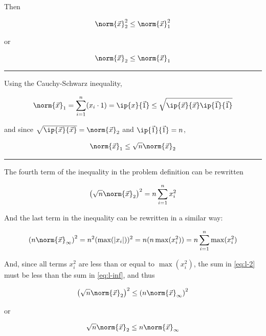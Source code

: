 \documentclass{template}
\begin{document}
Then

\begin{equation}
    \norm{\vec{x}}_2^2 \leq \norm{\vec{x}}_1^2
\end{equation}

or

\begin{equation}\label{eq:second_norm_inequality}
    \norm{\vec{x}}_2 \leq \norm{\vec{x}}_1
\end{equation}

\hrule

Using the Cauchy-Schwarz inequality, 

\begin{equation}
    \norm{\vec{x}}_1 = \sum_{i=1}^n (x_i\cdot 1) = \ip{x}{\vec{1}} \leq \sqrt{\ip{\vec{x}}{\vec{x}} \ip{\vec{1}}{\vec{1}}}
\end{equation}

and since $\sqrt{\ip{\vec{x}}{\vec{x}}} = \norm{\vec{x}}_2$ and $\ip{\vec{1}}{\vec{1}} = n$,

\begin{equation}\label{eq:third_norm_inequality}
    \norm{\vec{x}}_1 \leq \sqrt{n}\norm{\vec{x}}_2
\end{equation}

\hrule

The fourth term of the inequality in the problem definition can be rewritten

\begin{equation}\label{eq:l-2}
    \left( \sqrt{n} \norm{\vec{x}}_2    \right)^2 = n\sum_{i=1}^n x_i^2
\end{equation}

And the last term in the inequality can be rewritten in a similar way:

\begin{equation}\label{eq:l-inf}
    \left( n \norm{\vec{x}}_\infty\right)^2 = n^2(\max(|x_i|))^2     = n(n\max(x_i^2)) = n\sum_{i=1}^n \max(x_i^2)
\end{equation}

And, since all terms $x_i^2$ are less than or equal to $\max(x_i^2)$, the sum in \autoref{eq:l-2} must be less than the sum in \autoref{eq:l-inf}, and thus

\begin{equation}
    \left( \sqrt{n} \norm{\vec{x}}_2    \right)^2 \leq \left( n \norm{\vec{x}}_\infty\right)^2
\end{equation}

or

\begin{equation}\label{eq:fourth_norm_inequality}
    \sqrt{n}\norm{\vec{x}}_2 \leq n \norm{\vec{x}}_\infty
\end{equation}
\end{document}
